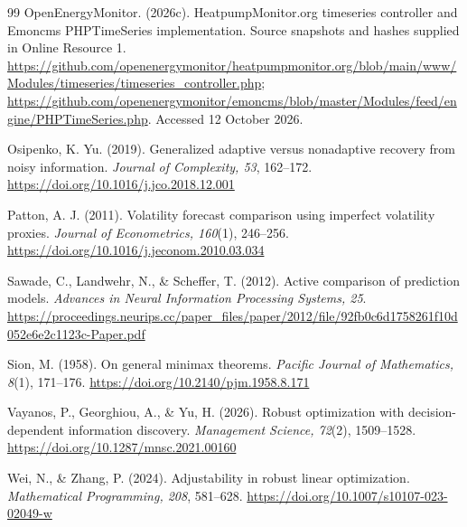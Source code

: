 \documentclass[12pt]{article}
\begin{document}
\begin{thebibliography}{99}
OpenEnergyMonitor. (2026c). HeatpumpMonitor.org timeseries controller and
Emoncms PHPTimeSeries implementation. Source snapshots and hashes supplied
in Online Resource 1.
\url{https://github.com/openenergymonitor/heatpumpmonitor.org/blob/main/www/Modules/timeseries/timeseries_controller.php};
\url{https://github.com/openenergymonitor/emoncms/blob/master/Modules/feed/engine/PHPTimeSeries.php}.
Accessed 12 October 2026.

Osipenko, K. Yu. (2019). Generalized adaptive versus nonadaptive recovery
from noisy information. \emph{Journal of Complexity, 53}, 162--172.
\url{https://doi.org/10.1016/j.jco.2018.12.001}

Patton, A. J. (2011). Volatility forecast comparison using imperfect
volatility proxies. \emph{Journal of Econometrics, 160}(1), 246--256.
\url{https://doi.org/10.1016/j.jeconom.2010.03.034}

Sawade, C., Landwehr, N., \& Scheffer, T. (2012).
Active comparison of prediction models.
\emph{Advances in Neural Information Processing Systems, 25}.
\url{https://proceedings.neurips.cc/paper_files/paper/2012/file/92fb0c6d1758261f10d052e6e2c1123c-Paper.pdf}

Sion, M. (1958). On general minimax theorems.
\emph{Pacific Journal of Mathematics, 8}(1), 171--176.
\url{https://doi.org/10.2140/pjm.1958.8.171}

Vayanos, P., Georghiou, A., \& Yu, H. (2026).
Robust optimization with decision-dependent information discovery.
\emph{Management Science, 72}(2), 1509--1528.
\url{https://doi.org/10.1287/mnsc.2021.00160}

Wei, N., \& Zhang, P. (2024). Adjustability in robust linear optimization.
\emph{Mathematical Programming, 208}, 581--628.
\url{https://doi.org/10.1007/s10107-023-02049-w}
\end{thebibliography}
\end{document}
